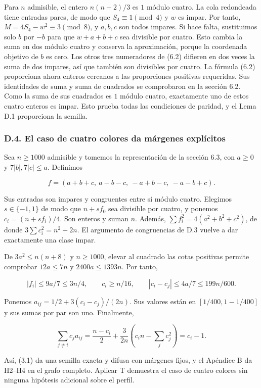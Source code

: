 \documentclass[spanish,11pt,a4paper]{article}
\begin{document}
Para \(n\) admisible, el entero \(n(n+2)/3\) es \(1\) módulo cuatro. La cola redondeada tiene entradas pares, de modo que \(S_4\equiv1\pmod4\) y \(w\) es impar. Por tanto, \(M=4S_4-w^2\equiv3\pmod8\), y \(a,b,c\) son todos impares. Si hace falta, sustituimos solo \(b\) por \(-b\) para que \(w+a+b+c\) sea divisible por cuatro. Esto cambia la suma en dos módulo cuatro y conserva la aproximación, porque la coordenada objetivo de \(b\) es cero. Los otros tres numeradores de (6.2) difieren en dos veces la suma de dos impares, así que también son divisibles por cuatro. La fórmula (6.2) proporciona ahora enteros cercanos a las proporciones positivas requeridas. Sus identidades de suma y suma de cuadrados se comprobaron en la sección 6.2. Como la suma de sus cuadrados es \(1\) módulo cuatro, exactamente uno de estos cuatro enteros es impar. Esto prueba todas las condiciones de paridad, y el Lema D.1 proporciona la semilla.

\subsubsection{D.4. El caso de cuatro colores da márgenes explícitos}\label{d.4.-el-caso-de-cuatro-colores-da-muxe1rgenes-expluxedcitos}

Sea \(n\ge1000\) admisible y tomemos la representación de la sección 6.3, con \(a\ge0\) y \(7|b|,7|c|\le a\). Definimos

\[f=(a+b+c,\ a-b-c,\ -a+b-c,\ -a-b+c).\]

Sus entradas son impares y congruentes entre sí módulo cuatro. Elegimos \(s\in\{-1,1\}\) de modo que \(n+sf_0\) sea divisible por cuatro, y ponemos \(c_i=(n+sf_i)/4\). Son enteros y suman \(n\). Además, \(\sum f_i^2=4(a^2+b^2+c^2)\), de donde \(3\sum c_i^2=n^2+2n\). El argumento de congruencias de D.3 vuelve a dar exactamente una clase impar.

De \(3a^2\le n(n+8)\) y \(n\ge1000\), elevar al cuadrado las cotas positivas permite comprobar \(12a\le7n\) y \(2400a\le1393n\). Por tanto,

\[|f_i|\le9a/7\le3n/4,\qquad c_i\ge n/16,\qquad |c_i-c_j|\le4a/7\le199n/600.\]

Ponemos \(a_{ij}=1/2+3(c_i-c_j)/(2n)\). Sus valores están en \([1/400,1-1/400]\) y sus sumas por par son uno. Finalmente,

\[\sum_{j\ne i}c_ja_{ij}=\frac{n-c_i}{2}+\frac{3}{2n}\left(c_in-\sum_jc_j^2\right)=c_i-1.\]

Así, (3.1) da una semilla exacta y difusa con márgenes fijos, y el Apéndice B da H2--H4 en el grafo completo. Aplicar T demuestra el caso de cuatro colores sin ninguna hipótesis adicional sobre el perfil.
\end{document}
